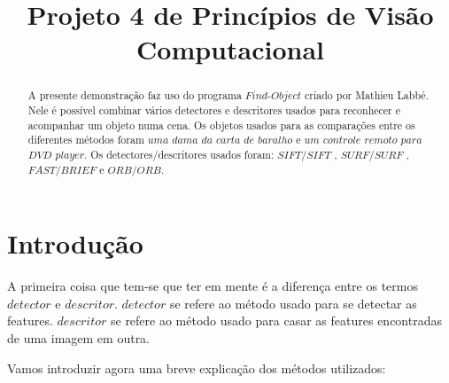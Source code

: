 \documentclass[conference]{IEEEtran}
\begin{document}
\title{Projeto 4 de Princ\'ipios de Vis\~ao Computacional}
\author{
}
\maketitle
\begin{abstract}
A presente demonstra\c{c}\~ao faz uso do programa $Find$-$Object$ criado por Mathieu Labbé. Nele \'e poss\'ivel 
combinar v\'arios detectores e descritores usados para reconhecer e acompanhar um objeto numa cena. Os objetos usados para as
compara\c{c}\~oes entre os diferentes m\'etodos foram $uma $ $dama $ $da $ $carta $ $de $ $baralho$ e 
$um $ $controle $ $remoto $ $para $ $DVD $ $player$. Os detectores/descritores usados foram: $SIFT$/$SIFT$ , $SURF$/$SURF$ , 
$FAST$/$BRIEF$ e $ORB$/$ORB$.


\end{abstract}

\section{ Introdu\c{c}\~ao} 
\label{sec:meth} 
	 \nobreak\hspace{.16667em plus .08333em} 
	 A primeira coisa que tem-se que ter em mente \'e a diferen\c{c}a entre os termos $detector$ e $descritor$. 
	 $detector$ se refere ao m\'etodo usado para se detectar as features.				    
	 $descritor$ se refere ao m\'etodo usado para casar as features encontradas de uma imagem em outra.
	 
	 Vamos introduzir agora uma breve explica\c{c}\~ao dos m\'etodos utilizados: \\
	 
\end{document}
